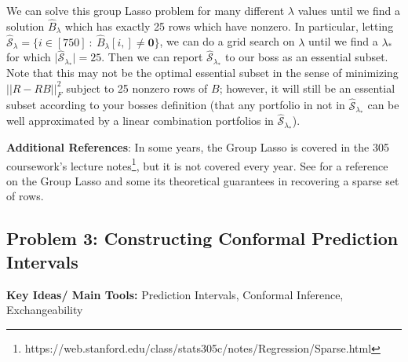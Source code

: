 We can solve this group Lasso problem for many different $\lambda$ values until we find a solution $\hat{B}_{\lambda}$ which has exactly 25 rows which have nonzero. In particular, letting $\hat{\mathcal{S}}_{\lambda}=  \{ i \in [750] \ : \ \hat{B}_{\lambda}[i,] \neq \mathbf{0} \}$, we can do a grid search on $\lambda$ until we find a $\lambda_*$ for which $\vert \hat{\mathcal{S}}_{\lambda_*} \vert =25$. Then we can report $\hat{\mathcal{S}}_{\lambda_*}$ to our boss as an essential subset. Note that this may not be the optimal essential subset in the sense of minimizing $\vert \vert R - R B \vert \vert_{F}^2$ subject to 25 nonzero rows of $B$; however, it will still be an essential subset according to your bosses definition (that any portfolio in not in $\hat{\mathcal{S}}_{\lambda_*}$ can be well approximated by a linear combination portfolios in $\hat{\mathcal{S}}_{\lambda_*}$).



\textbf{Additional References}: In some years, the Group Lasso is covered in the 305 coursework's lecture notes\footnote{https://web.stanford.edu/class/stats305c/notes/Regression/Sparse.html}, but it is not covered every year. See \cite{GroupLasso2013Obozinski} for a reference on the Group Lasso and some its theoretical guarantees in recovering a sparse set of rows.


\subsection*{Problem 3: Constructing Conformal Prediction Intervals}

\textbf{Key Ideas/ Main Tools:} Prediction Intervals, Conformal Inference, Exchangeability


